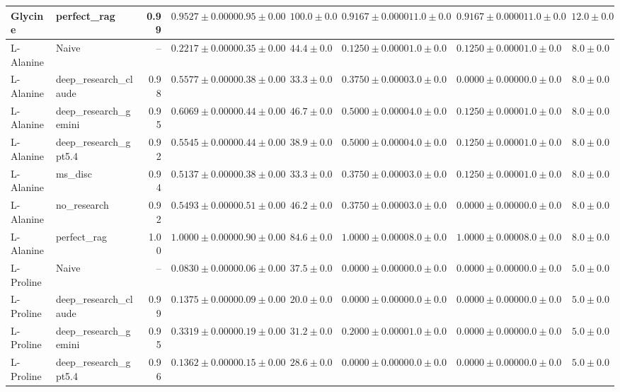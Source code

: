 \begin{table}[htbp]
\begin{tabular}{llrrrrrrrrr}
Glycine & perfect_rag & 0.99 & \cellcolor{green!25}$0.9527 \pm 0.0000$ & $0.95 \pm 0.00$ & $100.0 \pm 0.0$ & $0.9167 \pm 0.0000$ & $11.0 \pm 0.0$ & $0.9167 \pm 0.0000$ & $11.0 \pm 0.0$ & $12.0 \pm 0.0$ \\
\midrule
L-Alanine & Naive & -- & \cellcolor{red!25}$0.2217 \pm 0.0000$ & $0.35 \pm 0.00$ & $44.4 \pm 0.0$ & $0.1250 \pm 0.0000$ & $1.0 \pm 0.0$ & $0.1250 \pm 0.0000$ & $1.0 \pm 0.0$ & $8.0 \pm 0.0$ \\
L-Alanine & deep_research_claude & 0.98 & $0.5577 \pm 0.0000$ & $0.38 \pm 0.00$ & $33.3 \pm 0.0$ & $0.3750 \pm 0.0000$ & $3.0 \pm 0.0$ & $0.0000 \pm 0.0000$ & $0.0 \pm 0.0$ & $8.0 \pm 0.0$ \\
L-Alanine & deep_research_gemini & 0.95 & $0.6069 \pm 0.0000$ & $0.44 \pm 0.00$ & $46.7 \pm 0.0$ & $0.5000 \pm 0.0000$ & $4.0 \pm 0.0$ & $0.1250 \pm 0.0000$ & $1.0 \pm 0.0$ & $8.0 \pm 0.0$ \\
L-Alanine & deep_research_gpt5.4 & 0.92 & $0.5545 \pm 0.0000$ & $0.44 \pm 0.00$ & $38.9 \pm 0.0$ & $0.5000 \pm 0.0000$ & $4.0 \pm 0.0$ & $0.1250 \pm 0.0000$ & $1.0 \pm 0.0$ & $8.0 \pm 0.0$ \\
L-Alanine & ms_disc & 0.94 & $0.5137 \pm 0.0000$ & $0.38 \pm 0.00$ & $33.3 \pm 0.0$ & $0.3750 \pm 0.0000$ & $3.0 \pm 0.0$ & $0.1250 \pm 0.0000$ & $1.0 \pm 0.0$ & $8.0 \pm 0.0$ \\
L-Alanine & no_research & 0.92 & $0.5493 \pm 0.0000$ & $0.51 \pm 0.00$ & $46.2 \pm 0.0$ & $0.3750 \pm 0.0000$ & $3.0 \pm 0.0$ & $0.0000 \pm 0.0000$ & $0.0 \pm 0.0$ & $8.0 \pm 0.0$ \\
L-Alanine & perfect_rag & 1.00 & \cellcolor{green!25}$1.0000 \pm 0.0000$ & $0.90 \pm 0.00$ & $84.6 \pm 0.0$ & $1.0000 \pm 0.0000$ & $8.0 \pm 0.0$ & $1.0000 \pm 0.0000$ & $8.0 \pm 0.0$ & $8.0 \pm 0.0$ \\
\midrule
L-Proline & Naive & -- & \cellcolor{red!25}$0.0830 \pm 0.0000$ & $0.06 \pm 0.00$ & $37.5 \pm 0.0$ & $0.0000 \pm 0.0000$ & $0.0 \pm 0.0$ & $0.0000 \pm 0.0000$ & $0.0 \pm 0.0$ & $5.0 \pm 0.0$ \\
L-Proline & deep_research_claude & 0.99 & $0.1375 \pm 0.0000$ & $0.09 \pm 0.00$ & $20.0 \pm 0.0$ & $0.0000 \pm 0.0000$ & $0.0 \pm 0.0$ & $0.0000 \pm 0.0000$ & $0.0 \pm 0.0$ & $5.0 \pm 0.0$ \\
L-Proline & deep_research_gemini & 0.95 & $0.3319 \pm 0.0000$ & $0.19 \pm 0.00$ & $31.2 \pm 0.0$ & $0.2000 \pm 0.0000$ & $1.0 \pm 0.0$ & $0.0000 \pm 0.0000$ & $0.0 \pm 0.0$ & $5.0 \pm 0.0$ \\
L-Proline & deep_research_gpt5.4 & 0.96 & $0.1362 \pm 0.0000$ & $0.15 \pm 0.00$ & $28.6 \pm 0.0$ & $0.0000 \pm 0.0000$ & $0.0 \pm 0.0$ & $0.0000 \pm 0.0000$ & $0.0 \pm 0.0$ & $5.0 \pm 0.0$ \\

\end{tabular}
\end{table}
